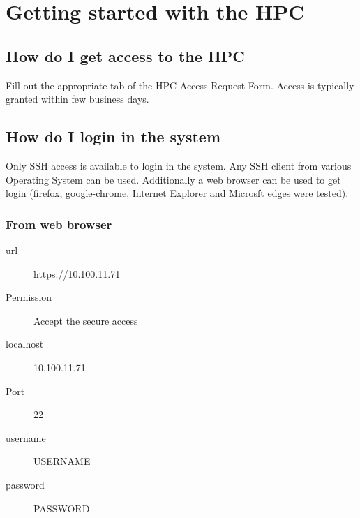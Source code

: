 \documentclass[11pt]{article}
\numberwithin{figure}{section}
\newcommand\CC{\Lang{\mbox{C++}}\xspace}
\newcommand\Lang[1]{\textsc{#1}}
\begin{document}
\maketitle


\section{Getting started with the HPC}

\subsection{How do I get access to the HPC}
Fill out the appropriate tab of the HPC Access Request Form. Access is
typically granted within few business days.

\subsection{How do I login in the system}
Only SSH access is available to login in the system. Any SSH client from
various Operating System can be used. Additionally a web browser can be used to
get login (firefox, google-chrome, Internet Explorer and Microsft edges were
tested).

\subsubsection{From web browser}

\begin{description}
    \item[url] https://10.100.11.71
    \item[Permission] Accept the secure access
    \item[localhost] 10.100.11.71
    \item[Port] 22
    \item[username] USERNAME
    \item[password] PASSWORD
\end{description}
\end{document}
